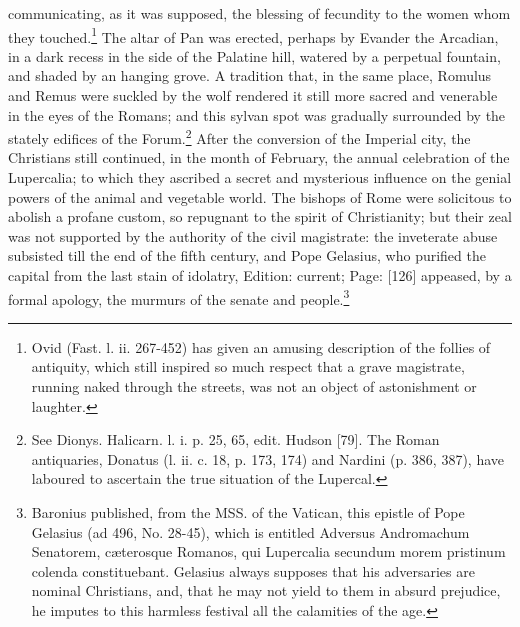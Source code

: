 communicating, as it was supposed, the blessing of fecundity to the women whom they touched.\footnote{Ovid (Fast. l. ii. 267-452) has given an amusing description of the follies of antiquity, which still inspired so much respect that a grave magistrate, running naked through the streets, was not an object of astonishment or laughter.} The altar of Pan was erected, perhaps by Evander the Arcadian, in a dark recess in the side of the Palatine hill, watered by a perpetual fountain, and shaded by an hanging grove. A tradition that, in the same place, Romulus and Remus were suckled by the wolf rendered it still more sacred and venerable in the eyes of the Romans; and this sylvan spot was gradually surrounded by the stately edifices of the Forum.\footnote{See Dionys. Halicarn. l. i. p. 25, 65, edit. Hudson [79]. The Roman antiquaries, Donatus (l. ii. c. 18, p. 173, 174) and Nardini (p. 386, 387), have laboured to ascertain the true situation of the Lupercal.} After the conversion of the Imperial city, the Christians still continued, in the month of February, the annual celebration of the Lupercalia; to which they ascribed a secret and mysterious influence on the genial powers of the animal and vegetable world. The bishops of Rome were solicitous to abolish a profane custom, so repugnant to the spirit of Christianity; but their zeal was not supported by the authority of the civil magistrate: the inveterate abuse subsisted till the end of the fifth century, and Pope Gelasius, who purified the capital from the last stain of idolatry, Edition: current; Page: [126] appeased, by a formal apology, the murmurs of the senate and people.\footnote{Baronius published, from the MSS. of the Vatican, this epistle of Pope Gelasius (ad 496, No. 28-45), which is entitled Adversus Andromachum Senatorem, cæterosque Romanos, qui Lupercalia secundum morem pristinum colenda constituebant. Gelasius always supposes that his adversaries are nominal Christians, and, that he may not yield to them in absurd prejudice, he imputes to this harmless festival all the calamities of the age.}


